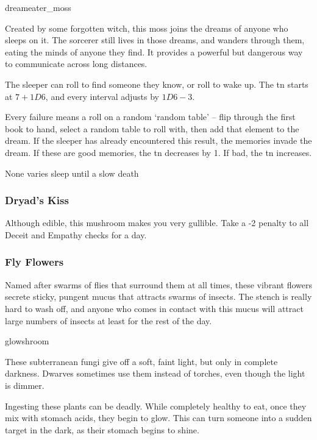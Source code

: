 \begin{multicols}{2}
%
  {dreameater_moss}%
  {
    Created by some forgotten witch, this moss joins the dreams of anyone who sleeps on it.
    The sorcerer still lives in those dreams, and wanders through them, eating the minds of anyone they find.
    It provides a powerful but dangerous way to communicate across long distances.

    The sleeper can roll  to find someone they know, or roll  to wake up.
    The \gls{tn} starts at $7 + 1D6$, and every \gls{interval} adjusts by $1D6 - 3$.

    Every failure means a roll on a random `random table' -- flip through the first book to hand, select a random table to roll with, then add that element to the dream.
    If the sleeper has already encountered this result, the memories invade the dream.
    If these are good memories, the \gls{tn} decreases by 1.
    If bad, the \gls{tn} increases.
  }
  {None}%
  {varies}%
  {sleep until a slow death}%

\subsubsection{Dryad's Kiss}
\label{dryads_kiss}

Although edible, this mushroom makes you very gullible.
Take a -2 penalty to all Deceit and Empathy checks for a day.

\subsubsection{Fly Flowers}
\label{fly_flowers}

Named after swarms of flies that surround them at all times, these vibrant flowers secrete sticky, pungent mucus that attracts swarms of insects.
The stench is really hard to wash off, and anyone who comes in contact with this mucus will attract large numbers of insects at least for the rest of the day.

%
  {glowshroom}%
  {
   These subterranean fungi give off a soft, faint light, but only in complete darkness.
   Dwarves sometimes use them instead of torches, even though the light is dimmer.

   Ingesting these plants can be deadly.
   While completely healthy to eat, once they mix with stomach acids, they begin to glow.
   This can turn someone into a sudden target in the dark, as their stomach begins to shine.

}
\end{multicols}

